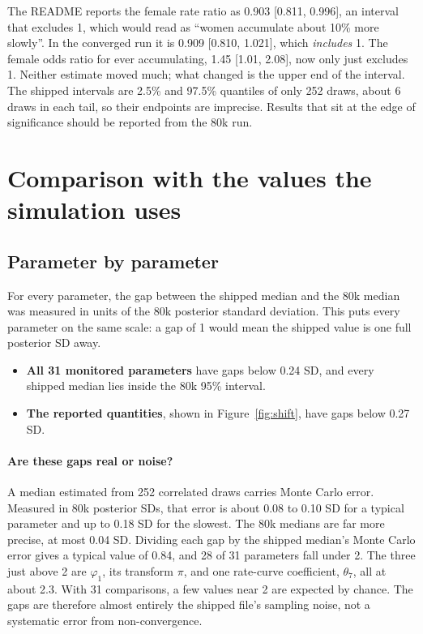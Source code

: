 \documentclass[11pt]{article}
\begin{document}
\begin{caution}
The README reports the female rate ratio as 0.903 [0.811, 0.996], an interval that excludes 1, which would read as ``women accumulate about 10\% more slowly''. In the converged run it is 0.909 [0.810, 1.021], which \emph{includes} 1. The female odds ratio for ever accumulating, 1.45 [1.01, 2.08], now only just excludes 1. Neither estimate moved much; what changed is the upper end of the interval. The shipped intervals are 2.5\% and 97.5\% quantiles of only 252 draws, about 6 draws in each tail, so their endpoints are imprecise. Results that sit at the edge of significance should be reported from the 80k run.
\end{caution}

\section{Comparison with the values the simulation uses}

\subsection{Parameter by parameter}

For every parameter, the gap between the shipped median and the 80k median was measured in units of the 80k posterior standard deviation. This puts every parameter on the same scale: a gap of 1 would mean the shipped value is one full posterior SD away.

\begin{itemize}
  \item \textbf{All 31 monitored parameters} have gaps below 0.24 SD, and every shipped median lies inside the 80k 95\% interval.
  \item \textbf{The reported quantities}, shown in Figure~\ref{fig:shift}, have gaps below 0.27 SD.
\end{itemize}

\paragraph{Are these gaps real or noise?} A median estimated from 252 correlated draws carries Monte Carlo error. Measured in 80k posterior SDs, that error is about 0.08 to 0.10 SD for a typical parameter and up to 0.18 SD for the slowest. The 80k medians are far more precise, at most 0.04 SD. Dividing each gap by the shipped median's Monte Carlo error gives a typical value of 0.84, and 28 of 31 parameters fall under 2. The three just above 2 are $\varphi_1$, its transform $\pi$, and one rate-curve coefficient, $\theta_7$, all at about 2.3. With 31 comparisons, a few values near 2 are expected by chance. The gaps are therefore almost entirely the shipped file's sampling noise, not a systematic error from non-convergence.
\end{document}
